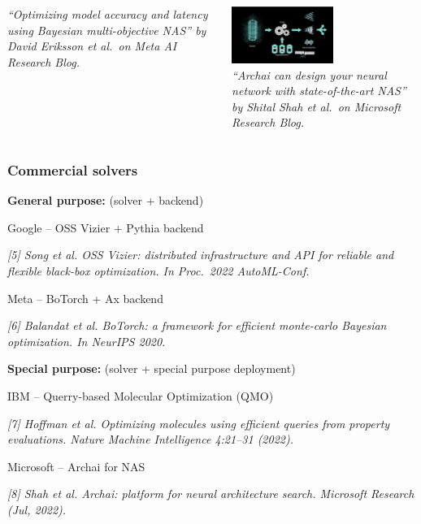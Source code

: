 \documentclass[aspectratio=169]{beamer}
\begin{document}
\begin{frame}
\begin{columns}
\begin{column}{0.33\textwidth}
\begin{center}
{\tiny \sl
``Optimizing model accuracy and latency using Bayesian multi-objective NAS''
by David Eriksson et al.\ on Meta AI Research Blog.\\
}
\end{center}
\end{column}
\begin{column}{0.33\textwidth}
\begin{center}
\includegraphics[height=5em]{../img/probs/microsoft-nas.png}\\
{\tiny \sl
``Archai can design your neural network with state-of-the-art NAS''
by Shital Shah et al.\ on Microsoft Research Blog.\\
}
\end{center}
\end{column}
\end{columns}
\end{frame}

\begin{frame}\frametitle{Commercial solvers}


{\large \bf General purpose:} (solver + backend)\\

\bigskip

Google -- OSS Vizier + Pythia backend

{\tiny\it
[5] Song et al.
OSS Vizier: distributed infrastructure and API for reliable and flexible black-box optimization.
In Proc.\ 2022 AutoML-Conf.
}

\bigskip

Meta -- BoTorch + Ax backend

{\tiny\it
[6] Balandat et al.
BoTorch: a framework for efficient monte-carlo Bayesian optimization.
In NeurIPS 2020.
}

\bigskip

{\large \bf Special purpose:} (solver + special purpose deployment)\\

\bigskip

IBM -- Querry-based Molecular Optimization (QMO)

{\tiny\it
[7] Hoffman et al.
Optimizing molecules using efficient queries from property evaluations.
Nature Machine Intelligence 4:21--31 (2022).
}

\bigskip

Microsoft -- Archai for NAS

{\tiny\it
[8] Shah et al.
Archai: platform for neural architecture search.
Microsoft Research (Jul, 2022).
}
\end{frame}
\end{document}
